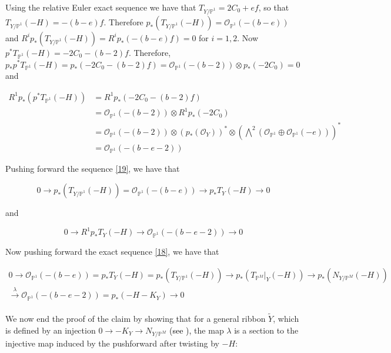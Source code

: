 \documentclass[11pt,twoside]{amsart}
\theoremstyle{plain}
\numberwithin{equation}{section}
\theoremstyle{definition}
\begin{document}
Using the relative Euler exact sequence we have that 
$T_{Y/\mathbb{P}^1} = 2C_0+ef$, so that $T_{Y/\mathbb{P}^1}(-H) = -(b-e)f$. Therefore $p_*(T_{Y/\mathbb{P}^1}(-H)) = \mathcal{O}_{\mathbb{P}^1}(-(b-e))$ and $R^ip_*(T_{Y/\mathbb{P}^1}(-H)) = R^ip_*(-(b-e)f) = 0$ for $i = 1,2$. Now $p^*T_{\mathbb{P}^1}(-H) = -2C_0-(b-2)f$. Therefore, $p_*p^*T_{\mathbb{P}^1}(-H) = p_*(-2C_0-(b-2)f) = \mathcal{O}_{\mathbb{P}^1}(-(b-2)) \otimes p_*(-2C_0) = 0$ and

\begin{align*}\label{20}
  R^1p_*(p^*T_{\mathbb{P}^1}(-H)) & = R^1p_*(-2C_0-(b-2)f) \\
  & = \mathcal{O}_{\mathbb{P}^1}(-(b-2)) \otimes R^1p_*(-2C_0) \\
  & = \mathcal{O}_{\mathbb{P}^1}(-(b-2)) \otimes (p_*(\mathcal{O}_Y))^* \otimes (\bigwedge^2(\mathcal{O}_{\mathbb{P}^1} \oplus \mathcal{O}_{\mathbb{P}^1}(-e)))^* \\ 
  & = \mathcal{O}_{\mathbb{P}^1}(-(b-e-2))
\end{align*}

Pushing forward the sequence \ref{19}, we have that 

\begin{equation}\label{21}
0 \to p_*(T_{Y/\mathbb{P}^1}(-H)) = \mathcal{O}_{\mathbb{P}^1}(-(b-e)) \to p_*T_Y(-H) \to 0    
\end{equation}

and 

\begin{equation}\label{22}
   0 \to R^1p_*T_Y(-H) \to \mathcal{O}_{\mathbb{P}^1}(-(b-e-2)) \to 0 
\end{equation}

Now pushing forward the exact sequence \ref{18}, we have that 

\begin{multline}\label{23}
0 \to \mathcal{O}_{\mathbb{P}^1}(-(b-e)) = p_*T_Y(-H) = p_*(T_{Y/\mathbb{P}^1}(-H)) \to p_*(T_{\mathbb{P}^M}|_Y(-H)) \to p_*(N_{Y/\mathbb{P}^M}(-H)) \\ \xrightarrow[]{\lambda} \mathcal{O}_{\mathbb{P}^1}(-(b-e-2)) = p_*(-H-K_Y) \to 0
\end{multline}

We now end the proof of the claim by showing that for a general ribbon $\widetilde{Y}$, which is defined by an injection $0 \to -K_Y \to N_{Y/\mathbb{P}^M}$ \textcolor{black}{(see \cite[Theorem $1.1$]{BMR21}),} the map $\lambda$ is a section to the injective map induced by the pushforward after twisting by $-H$: 
\end{document}
